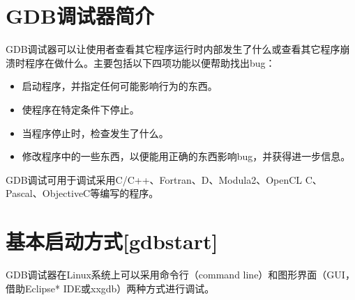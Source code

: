 \documentclass[a4paper,12pt,english]{sphinxmanual}
\begin{document}
\section{GDB调试器简介}
\label{\detokenize{debug/debug:gdb}}
\sphinxAtStartPar
GDB调试器可以让使用者查看其它程序运行时内部发生了什么或查看其它程序崩溃时程序在做什么。主要包括以下四项功能以便帮助找出bug：
\begin{itemize}
\item {} 
\sphinxAtStartPar
启动程序，并指定任何可能影响行为的东西。

\item {} 
\sphinxAtStartPar
使程序在特定条件下停止。

\item {} 
\sphinxAtStartPar
当程序停止时，检查发生了什么。

\item {} 
\sphinxAtStartPar
修改程序中的一些东西，以便能用正确的东西影响bug，并获得进一步信息。

\end{itemize}

\sphinxAtStartPar
GDB调试可用于调试采用C/C++、Fortran、D、Modula\sphinxhyphen{}2、OpenCL C、Pascal、Objective\sphinxhyphen{}C等编写的程序。


\section{基本启动方式{[}gdbstart{]}}
\label{\detokenize{debug/debug:gdbstart}}
\sphinxAtStartPar
GDB调试器在Linux系统上可以采用命令行（command line）和图形界面（GUI，借助Eclipse* IDE或xxgdb）两种方式进行调试。
\end{document}
